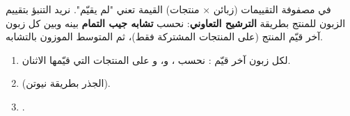 \begin{statement}
في مصفوفة التقييمات (زبائن × منتجات) القيمة  تعني "لم يقيّم". نريد التنبؤ بتقييم الزبون  للمنتج  بطريقة \textbf{الترشيح التعاوني}: نحسب \textbf{تشابه جيب التمام} بينه وبين كل زبون آخر قيّم المنتج (على المنتجات المشتركة فقط)، ثم المتوسط الموزون بالتشابه.
\end{statement}
\begin{stepsbox}\begin{enumerate}
\item لكل زبون آخر  قيّم : نحسب ، و، و على المنتجات التي قيّمها الاثنان.
\item {} (الجذر بطريقة نيوتن).
\item \par{\centering\small{}\par}.
\end{enumerate}\end{stepsbox}
